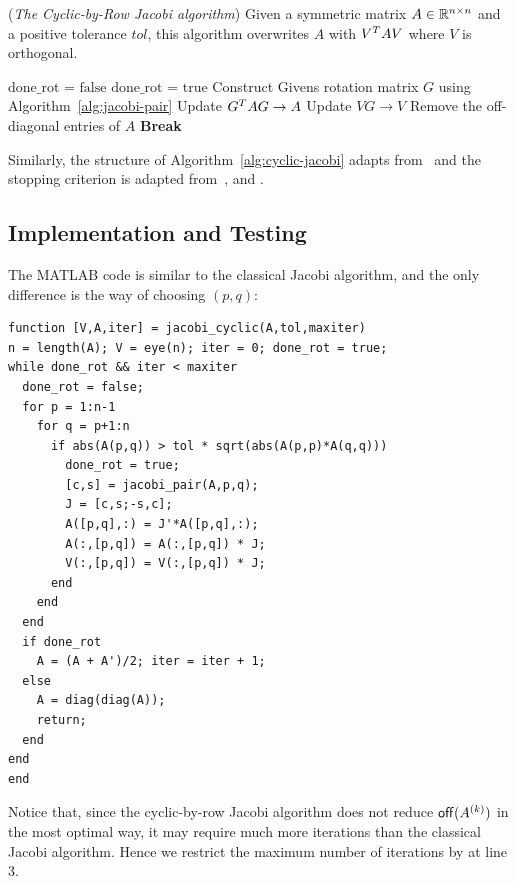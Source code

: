 \begin{algorithm}[ht]
  \caption{({\itshape The Cyclic-by-Row Jacobi algorithm}) Given a symmetric matrix $A\in\mathbb{R}^{n\times n}$ and a positive tolerance $tol$, this algorithm overwrites $A$ with $V^T AV$ where $V$ is orthogonal.}
  \label{alg:cyclic-jacobi}
  \begin{algorithmic}
    \State $\text{done\_rot = false}$
          \State $\text{done\_rot = true}$
          \State Construct Givens rotation matrix $G$ using Algorithm~\ref{alg:jacobi-pair}
          \State Update $G^T A G \to A$
          \State Update $VG \to V$
        \Else
          \State Remove the off-diagonal entries of $A$
          \State \textbf{Break}
        \EndIf
      \EndFor
    \EndFor
  \EndWhile
  \end{algorithmic}
\end{algorithm}

Similarly, the structure of Algorithm~\ref{alg:cyclic-jacobi} adapts from~ and the stopping criterion is adapted from~,  and .

\subsection{Implementation and Testing}
The MATLAB code is similar to the classical Jacobi algorithm, and the only difference is the way of choosing $(p,q)$:

\begin{lstlisting}
function [V,A,iter] = jacobi_cyclic(A,tol,maxiter)
n = length(A); V = eye(n); iter = 0; done_rot = true;
while done_rot && iter < maxiter
  done_rot = false;
  for p = 1:n-1
    for q = p+1:n
      if abs(A(p,q)) > tol * sqrt(abs(A(p,p)*A(q,q)))
        done_rot = true;
        [c,s] = jacobi_pair(A,p,q);
        J = [c,s;-s,c];
        A([p,q],:) = J'*A([p,q],:);
        A(:,[p,q]) = A(:,[p,q]) * J;
        V(:,[p,q]) = V(:,[p,q]) * J;
      end
    end
  end
  if done_rot 
    A = (A + A')/2; iter = iter + 1; 
  else
    A = diag(diag(A));
    return;
  end
end
end
\end{lstlisting}

Notice that, since the cyclic-by-row Jacobi algorithm does not reduce $\mathsf{off}(A^{(k)})$ in the most optimal way, it may require much more iterations than the classical Jacobi algorithm. Hence we restrict the maximum number of iterations by  at line 3.

